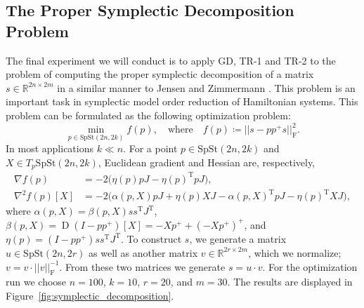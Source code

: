 \subsection{The Proper Symplectic Decomposition Problem}\label{sec:symplectic_decomposition}
The final experiment we will conduct is to apply GD, TR-1 and TR-2 to the problem of computing the proper symplectic decomposition of a matrix $s\in \mathbb{R}^{2n\times 2m}$ in a similar manner to Jensen and Zimmermann \cite[p.~18]{JensenZimmermann2024}. This problem is an important task in symplectic model order reduction of Hamiltonian systems. This problem can be formulated as the following optimization problem:
%
\begin{equation}
\min_{p \in \mathrm{SpSt}(2n, 2k)}f(p),\quad\text{where}\quad f(p)\coloneqq\lvert \lvert s-pp^{+}s \rvert  \rvert _{\mathrm{F}}^{2}.
\end{equation}
%
In most applications $k\ll n$. For a point $p\in \mathrm{SpSt}(2n, 2k)$ and $X\in T_{p}\mathrm{SpSt}(2n, 2k)$, Euclidean gradient and Hessian are, respectively,
%
\begin{align*}
\nabla f(p)&=-2\big(\eta(p)pJ-\eta(p)^{\mathrm{T}}pJ\big), \\
\nabla^{2}f(p)[X]&=-2\big(\alpha(p,X)pJ+\eta(p) XJ-\alpha(p,X)^{\mathrm{T}}pJ-\eta(p)^{\mathrm{T}}XJ\big),
\end{align*}
%
where $\alpha(p,X)=\beta(p,X)ss^{\mathrm{T}}J^{\mathrm{T}}$, $\beta(p,X)=\operatorname{D}(I-pp^{+})[X]=-Xp^{+}+(-Xp^{+})^{+}$, and \\$\eta(p)=(I-pp^{+})ss^{\mathrm{T}}J^{\mathrm{T}}$. To construct $s$, we generate a matrix $u\in \mathrm{SpSt}(2n, 2r)$ as well as another matrix $v\in \mathbb{R}^{2r\times 2m}$, which we normalize; $v=v\cdot \lvert \lvert v \rvert \rvert_{\mathrm{F}}^{-1}$. From these two matrices we generate $s=u\cdot v$. For the optimization run we choose $n=100$, $k=10$, $r=20$, and $m=30$. The results are displayed in Figure~\ref{fig:symplectic_decomposition}.


